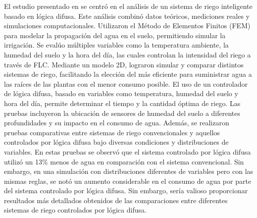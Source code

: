 \bigbreak
El estudio presentado en \cite{neugebauer_fuzzy_2023} se centró en el análisis de un sistema de riego inteligente basado en lógica difusa. Este análisis combinó datos teóricos, mediciones reales y simulaciones computacionales. Utilizaron el Método de Elementos Finitos (FEM) para modelar la propagación del agua en el suelo, permitiendo simular la irrigación. Se evalúo múltiples variables como la temperatura ambiente, la humedad del suelo y la hora del día, las cuales controlan la intensidad del riego a través de FLC. Mediante un modelo 2D, lograron simular y comparar distintos sistemas de riego, facilitando la elección del más eficiente para suministrar agua a las raíces de las plantas con el menor consumo posible. El uso de un controlador de lógica difusa, basado en variables como temperatura, humedad del suelo y hora del día, permite determinar el tiempo y la cantidad óptima de riego. Las pruebas incluyeron la ubicación de sensores de humedad del suelo a diferentes profundidades y su impacto en el consumo de agua. Además, se realizaron pruebas comparativas entre sistemas de riego convencionales y aquellos controlados por lógica difusa bajo diversas condiciones y distribuciones de variables. En estas pruebas se observó que el sistema controlado por lógica difusa utilizó un 13\% menos de agua en comparación con el sistema convencional. Sin embargo, en una simulación con distribuciones diferentes de variables pero con las mismas reglas, se notó un aumento considerable en el consumo de agua por parte del sistema controlado por lógica difusa. Sin embargo, sería valioso proporcionar resultados más detallados obtenidos de las comparaciones entre diferentes sistemas de riego controlados por lógica difusa.

